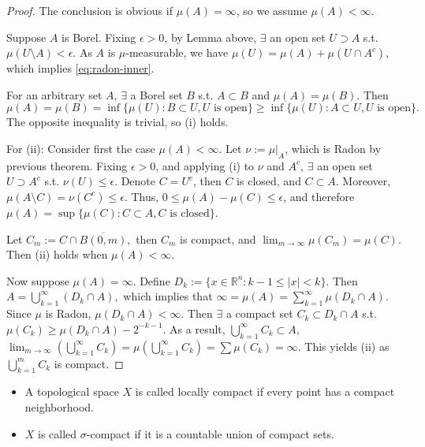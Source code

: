     \begin{proof}
        The conclusion is obvious if $\mu(A)=\infty$, so we assume $\mu(A)<\infty$.

        Suppose $A$ is Borel. Fixing $\epsilon >0$, by Lemma above, $\exists$ an open set $U\supset A$ s.t. $\mu(U\setminus A)<\epsilon.$ As $A$ is $\mu$-measurable, we have $\mu(U)=\mu(A)+\mu(U\cap A^{c})$, which implies \eqref{eq:radon-inner}.

        For an arbitrary set $A$, $\exists$ a Borel set $B$ s.t. $A\subset B$ and $\mu(A)=\mu(B)$. Then 
        \[
            \mu(A)=\mu(B) = \operatorname{inf}\{ \mu(U):B\subset U, U\text{ is open} \} \geq \operatorname{inf}\{ \mu(U):A\subset U, U\text{ is open} \}.
        \]
        The opposite inequality is trivial, so (i) holds.

        For (ii): Consider first the case $\mu(A)<\infty$. Let $\nu:=\mu|_{A}$, which is Radon by previous theorem. Fixing $\epsilon>0$, and applying (i) to $\nu$ and $A^{c}$, $\exists$ an open set $U\supset A^{c}$ s.t. $\nu(U)\leq\epsilon$. Denote $C=U^{c}$, then $C$ is closed, and $C\subset A$. Moreover, $\mu(A\setminus C)=\nu(C^{c})\leq\epsilon$. Thus, $0\leq \mu(A)-\mu(C)\leq\epsilon$, and therefore $\mu(A)=\operatorname{sup}\{ \mu(C):C\subset A, C\text{ is closed} \}$.

        Let $C_{m}:=C\cap \overline{B(0,m)},$ then $C_{m}$ is compact, and $\lim_{ m \to \infty } \mu(C_{m})=\mu(C)$. Then (ii) holds when $\mu(A)<\infty$.

        Now suppose $\mu(A)=\infty$. Define $D_{k}:=\{ x \in \mathbb{R}^{n}:k-1\leq \lvert x \rvert <k \}$. Then $A=\bigcup _{k=1}^{\infty}(D_{k}\cap A),$ which implies that $\infty=\mu(A)=\sum _{k=1}^{\infty}\mu(D_{k}\cap A)$. Since $\mu$ is Radon, $\mu(D_{k}\cap A)<\infty$. Then $\exists$ a compact set $C_{k}\subset D_{k}\cap A$ s.t. $\mu(C_{k})\geq \mu(D_{k}\cap A)-2^{-k-1}$. As a result, $\bigcup _{k=1}^{\infty}C_{k}\subset A$, $\lim_{ m \to \infty } \left( \bigcup _{k=1}^{\infty} C_{k} \right)=\mu\left( \bigcup _{k=1}^{\infty}C_{k} \right)=\sum \mu(C_{k})=\infty$. This yields (ii) as $\bigcup _{k=1}^{m}C_{k}$ is compact.
    \end{proof}

    \begin{definition}
        \begin{itemize}
            \item[(i)] A topological space $X$ is called locally compact if every point has a compact neighborhood.
            \item[(ii)] $X$ is called $\sigma$-compact if it is a countable union of compact sets.
        \end{itemize}
    \end{definition}

